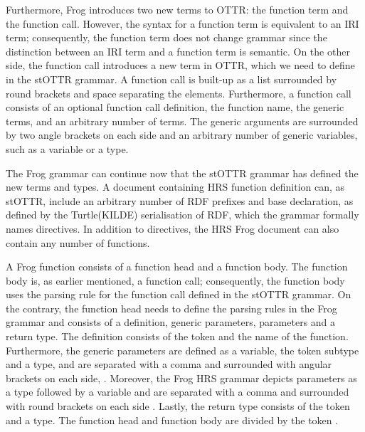 \para


\para
Furthermore, Frog introduces two new terms to OTTR: the function term and the function call. However, the syntax for a function term is equivalent to an IRI term; consequently, the function term does not change grammar since the distinction between an IRI term and a function term is semantic. On the other side, the function call introduces a new term in OTTR, which we need to define in the stOTTR grammar. A function call is built-up as a list surrounded by round brackets \backgroundText{( )} and space separating the elements. Furthermore, a function call consists of an optional function call definition, the function name, the generic terms, and an arbitrary number of terms. The generic arguments are surrounded by two angle brackets on each side \backgroundText{<< >>} and an arbitrary number of generic variables, such as a variable or a type.

\para



\para
The Frog grammar can continue now that the stOTTR grammar has defined the new terms and types. A document containing HRS function definition can, as stOTTR, include an arbitrary number of RDF prefixes and base declaration, as defined by the Turtle(KILDE) serialisation of RDF, which the grammar formally names directives. In addition to directives, the HRS Frog document can also contain any number of functions.  

\para


\para
A Frog function consists of a function head and a function body. The function body is, as earlier mentioned, a function call; consequently, the function body uses the parsing rule for the function call defined in the stOTTR grammar. On the contrary, the function head needs to define the parsing rules in the Frog grammar and consists of a definition, generic parameters, parameters and a return type. The definition consists of the token  and the name of the function. Furthermore, the generic parameters are defined as a variable, the token subtype and a type, and are separated with a comma and surrounded with angular brackets on each side, \backgroundText{<< >>}. Moreover, the Frog HRS grammar depicts parameters as a type followed by a variable and are separated with a comma and surrounded with round brackets on each side \backgroundText{( )}. Lastly, the return type consists of the token \backgroundText{->} and a type. The function head and function body are divided by the token \backgroundText{::}.

